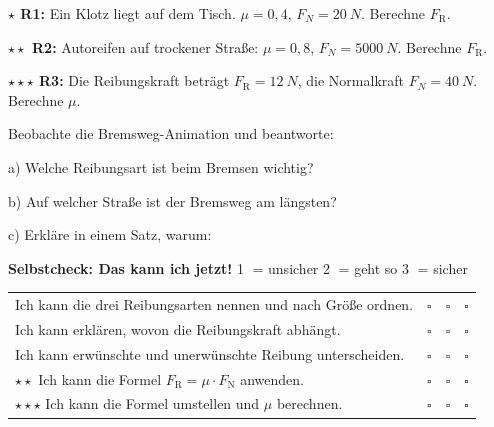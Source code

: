 \documentclass[11pt,a4paper]{article}
\newcommand{\luecke}[1]{\underline{\hspace{#1}}}
\newcommand{\stern}[1]{\textcolor{merkerand}{\textbf{#1}}}
\begin{document}
\vspace{0.3em}
\textbf{\stern{$\star$} R1:} Ein Klotz liegt auf dem Tisch. $\mu = 0{,}4$, $F_N = \SI{20}{N}$. Berechne $F_\text{R}$.

\vspace{1.5cm}

\textbf{\stern{$\star\star$} R2:} Autoreifen auf trockener Straße: $\mu = 0{,}8$, $F_N = \SI{5000}{N}$. Berechne $F_\text{R}$.

\vspace{1.5cm}

\textbf{\stern{$\star\star\star$} R3:} Die Reibungskraft beträgt $F_\text{R} = \SI{12}{N}$, die Normalkraft $F_N = \SI{40}{N}$. Berechne $\mu$.

\vspace{1.5cm}

\begin{protokollbox}[title=A2: Anwendung -- Bremsweg]
\small
Beobachte die Bremsweg-Animation und beantworte:

\vspace{0.3em}
a) Welche Reibungsart ist beim Bremsen wichtig? \luecke{3cm}

\vspace{0.3em}
b) Auf welcher Straße ist der Bremsweg am längsten? \luecke{3cm}

\vspace{0.3em}
c) Erkläre in einem Satz, warum: \luecke{7cm}

\luecke{12cm}
\end{protokollbox}

\vspace{0.4em}

\begin{merkkasten}
\textbf{Selbstcheck: Das kann ich jetzt!} \hfill {\scriptsize \textcircled{\scriptsize 1} = unsicher \quad \textcircled{\scriptsize 2} = geht so \quad \textcircled{\scriptsize 3} = sicher}

\vspace{0.2em}
\small
\renewcommand{\arraystretch}{1.2}
\begin{tabular}{p{10cm}ccc}
Ich kann die drei Reibungsarten nennen und nach Größe ordnen. & $\square$ & $\square$ & $\square$ \\
Ich kann erklären, wovon die Reibungskraft abhängt. & $\square$ & $\square$ & $\square$ \\
Ich kann erwünschte und unerwünschte Reibung unterscheiden. & $\square$ & $\square$ & $\square$ \\
\stern{$\star\star$} Ich kann die Formel $F_\text{R} = \mu \cdot F_\text{N}$ anwenden. & $\square$ & $\square$ & $\square$ \\
\stern{$\star\star\star$} Ich kann die Formel umstellen und $\mu$ berechnen. & $\square$ & $\square$ & $\square$ \\
\end{tabular}
\end{merkkasten}
\end{document}
